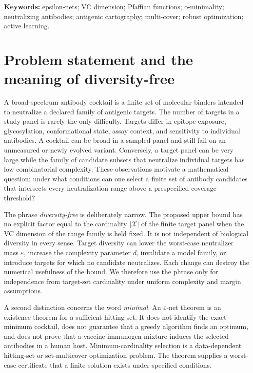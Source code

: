 \documentclass[11pt,a4paper]{article}
\newcommand{\Xcal}{\mathcal X}
\newcommand{\eps}{\varepsilon}
\begin{document}
\begin{titlepage}
\begin{minipage}{.93\textwidth}
\end{minipage}
\vfill\begin{flushleft}\small\textbf{Keywords:} epsilon-nets; VC dimension; Pfaffian functions; o-minimality; neutralizing antibodies; antigenic cartography; multi-cover; robust optimization; active learning.\end{flushleft}
\end{titlepage}
\hypersetup{pageanchor=true}
\begingroup\footnotesize\setlength{\parskip}{0pt}\tableofcontents\endgroup\clearpage
\listoffigures\listoftables\clearpage{}

\section{Problem statement and the meaning of diversity-free}
A broad-spectrum antibody cocktail is a finite set of molecular binders intended to neutralize a declared family of antigenic targets. The number of targets in a study panel is rarely the only difficulty. Targets differ in epitope exposure, glycosylation, conformational state, assay context, and sensitivity to individual antibodies. A cocktail can be broad in a sampled panel and still fail on an unmeasured or newly evolved variant. Conversely, a target panel can be very large while the family of candidate subsets that neutralize individual targets has low combinatorial complexity. These observations motivate a mathematical question: under what conditions can one select a finite set of antibody candidates that intersects every neutralization range above a prespecified coverage threshold?

The phrase \emph{diversity-free} is deliberately narrow. The proposed upper bound has no explicit factor equal to the cardinality $|\Xcal|$ of the finite target panel when the VC dimension of the range family is held fixed. It is not independent of biological diversity in every sense. Target diversity can lower the worst-case neutralizer mass $\eps$, increase the complexity parameter $d$, invalidate a model family, or introduce targets for which no candidate neutralizes. Each change can destroy the numerical usefulness of the bound. We therefore use the phrase only for independence from target-set cardinality under uniform complexity and margin assumptions.

A second distinction concerns the word \emph{minimal}. An $\eps$-net theorem is an existence theorem for a sufficient hitting set. It does not identify the exact minimum cocktail, does not guarantee that a greedy algorithm finds an optimum, and does not prove that a vaccine immunogen mixture induces the selected antibodies in a human host. Minimum-cardinality selection is a data-dependent hitting-set or set-multicover optimization problem. The theorem supplies a worst-case certificate that a finite solution exists under specified conditions.
\end{document}
